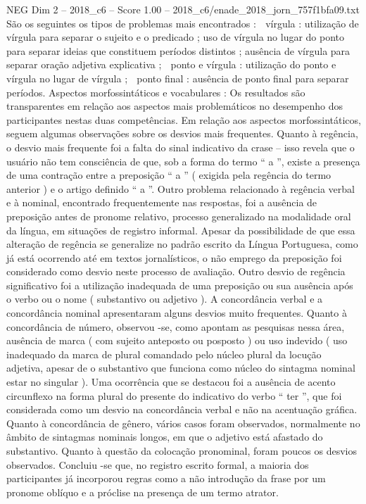 \begin{textsample}{NEG Dim 2 – 2018\_c6 – Score 1.00 – 2018\_c6/enade\_2018\_jorn\_757f1bfa09.txt}
São os seguintes os tipos de problemas mais encontrados :  vírgula : utilização de vírgula para separar o sujeito e o predicado ; uso de vírgula no lugar do ponto para separar ideias que constituem períodos distintos ; ausência de vírgula para separar oração adjetiva explicativa ;  ponto e vírgula : utilização do ponto e vírgula no lugar de vírgula ;  ponto final : ausência de ponto final para separar períodos.
Aspectos morfossintáticos e vocabulares : Os resultados são transparentes em relação aos aspectos mais problemáticos no desempenho dos participantes nestas duas competências.
Em relação aos aspectos morfossintáticos, seguem algumas observações sobre os desvios mais frequentes.
Quanto à regência, o desvio mais frequente foi a falta do sinal indicativo da crase – isso revela que o usuário não tem consciência de que, sob a forma do termo “ a ”, existe a presença de uma contração entre a preposição “ a ” ( exigida pela regência do termo anterior ) e o artigo definido “ a ”.
Outro problema relacionado à regência verbal e à nominal, encontrado frequentemente nas respostas, foi a ausência de preposição antes de pronome relativo, processo generalizado na modalidade oral da língua, em situações de registro informal.
Apesar da possibilidade de que essa alteração de regência se generalize no padrão escrito da Língua Portuguesa, como já está ocorrendo até em textos jornalísticos, o não emprego da preposição foi considerado como desvio neste processo de avaliação.
Outro desvio de regência significativo foi a utilização inadequada de uma preposição ou sua ausência após o verbo ou o nome ( substantivo ou adjetivo ).
A concordância verbal e a concordância nominal apresentaram alguns desvios muito frequentes.
Quanto à concordância de número, observou -se, como apontam as pesquisas nessa área, ausência de marca ( com sujeito anteposto ou posposto ) ou uso indevido ( uso inadequado da marca de plural comandado pelo núcleo plural da locução adjetiva, apesar de o substantivo que funciona como núcleo do sintagma nominal estar no singular ).
Uma ocorrência que se destacou foi a ausência de acento circunflexo na forma plural do presente do indicativo do verbo “ ter ”, que foi considerada como um desvio na concordância verbal e não na acentuação gráfica.
Quanto à concordância de gênero, vários casos foram observados, normalmente no âmbito de sintagmas nominais longos, em que o adjetivo está afastado do substantivo.
Quanto à questão da colocação pronominal, foram poucos os desvios observados.
Concluiu -se que, no registro escrito formal, a maioria dos participantes já incorporou regras como a não introdução da frase por um pronome oblíquo e a próclise na presença de um termo atrator.

\end{textsample}
